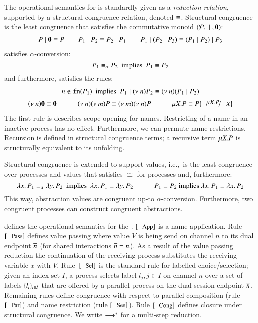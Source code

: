 The operational semantics for \HOp is standardly given as a \emph{reduction relation},
supported by a {structural congruence} relation, denoted $\equiv$. 
Structural congruence is 
the least congruence that satisfies the commutative monoid $(\mathcal{P}, \;|\;, \mathbf{0})$:
%
\[
\begin{array}{c}
	P \;|\; \mathbf{0} \equiv P
	\qquad
	P_1 \;|\; P_2 \equiv P_2 \;|\; P_1
	\qquad
	P_1 \;|\; (P_2 \;|\; P_3) \equiv (P_1 \;|\; P_2) \;|\; P_3
\end{array}
\]
%
\noi satisfies $\alpha$-conversion:
\[
	P_1 \equiv_\alpha P_2\ \textrm{  implies  }\ P_1 \equiv P_2
\]
\noi and furthermore, satisfies the rules:
%
\[
\begin{array}{c}
	n \notin \fn{P_1}\ \textrm{  implies  }\ P_1 \Par \news{n} P_2 \scong \news{n}(P_1 \Par P_2)
	\\[2mm]
	\news{n} \inact \scong \inact
	\qquad \quad
	\news{n} \news{m} P \scong \news{m} \news{n} P
	\qquad \quad
	\recp{X}{P} \scong P\subst{\recp{X}{P}}{\varp{X}}
\end{array}
\]
\noi The first rule is describes scope opening for names.
Restricting of a name in an inactive process has no effect.
Furthermore, we can permute name restrictions.
Recursion is defined in structural congruence terms;
a recursive term $\mu X. P$ is structurally
equivalent to its unfolding.

Structural congruence is extended to support values,
i.e.,~is the least congruence over processes and values
that satisfies $\cong$ for processes and, furthermore:
%
\[
	\lambda x.\,P_1 \equiv_\alpha \lambda y.\,P_2\ \textrm{ implies }\ \lambda x.\,P_1 \equiv \lambda y.\,P_2
	\qquad \quad
	P_1 \equiv P_2 \textrm{ implies } \lambda x.\,P_1 \equiv \lambda x.\,P_2
\]
%
\noi This way, abstraction values are congruent up-to $\alpha$-conversion.
Furthermore, two congruent processes can construct congruent
abstractions.





 defines
the operational semantics for the \HOp.
$\orule{App}$ is a name application.
Rule~$\orule{Pass}$ defines value passing where
value $V$ is being send on channel $n$ to its dual endpoint $\overline{n}$
(for shared interactions $\overline{n} = n$).
As a result of the value passing reduction the continuation of the 
receiving process substitutes the receiving variable $x$ with $V$.
Rule~$\orule{Sel}$ is the standard rule for labelled choice/selection;
given an index set $I$,
a process selects label $l_j, j \in I$ on channel $n$ over a set of
labels $\{l_i\}_{i \in I}$ that are offered by a parallel process
on the dual session endpoint $\overline{n}$.
Remaining rules define congruence 
with respect to parallel composition (rule $\orule{Par}$)
and name restriction (rule $\orule{Ses}$).
Rule $\orule{Cong}$ defines closure under structural congruence.
We write $\longrightarrow^\ast$ for a multi-step reduction. 

